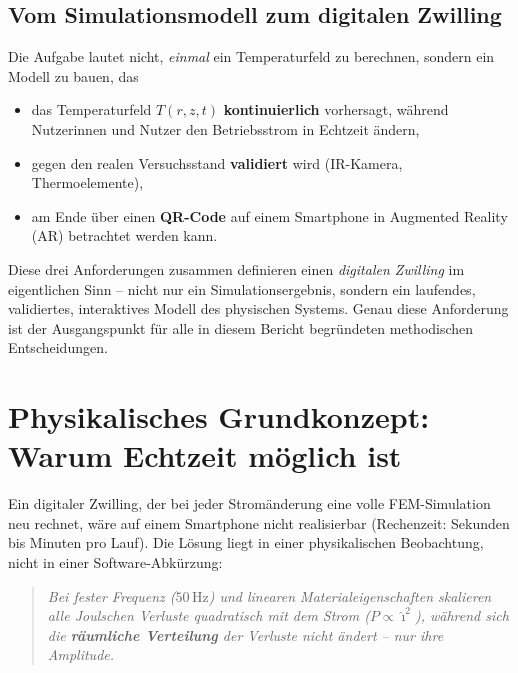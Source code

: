 \documentclass[a4paper,11pt]{article}
\begin{document}
\subsection{Vom Simulationsmodell zum digitalen Zwilling}
Die Aufgabe lautet nicht, \emph{einmal} ein Temperaturfeld zu berechnen,
sondern ein Modell zu bauen, das
\begin{itemize}[nosep]
  \item das Temperaturfeld $T(r,z,t)$ \textbf{kontinuierlich} vorhersagt, während
        Nutzerinnen und Nutzer den Betriebsstrom in Echtzeit ändern,
  \item gegen den realen Versuchsstand \textbf{validiert} wird (IR-Kamera,
        Thermoelemente),
  \item am Ende über einen \textbf{QR-Code} auf einem Smartphone in
        Augmented Reality (AR) betrachtet werden kann.
\end{itemize}
Diese drei Anforderungen zusammen definieren einen \emph{digitalen Zwilling}
im eigentlichen Sinn -- nicht nur ein Simulationsergebnis, sondern ein
laufendes, validiertes, interaktives Modell des physischen Systems. Genau
diese Anforderung ist der Ausgangspunkt für alle in diesem Bericht
begründeten methodischen Entscheidungen.

\section{Physikalisches Grundkonzept: Warum Echtzeit möglich ist}

Ein digitaler Zwilling, der bei jeder Stromänderung eine volle FEM-Simulation
neu rechnet, wäre auf einem Smartphone nicht realisierbar (Rechenzeit:
Sekunden bis Minuten pro Lauf). Die Lösung liegt in einer physikalischen
Beobachtung, nicht in einer Software-Abkürzung:

\begin{quote}
\itshape
Bei fester Frequenz ($50\,\mathrm{Hz}$) und linearen Materialeigenschaften
skalieren alle Joulschen Verluste quadratisch mit dem Strom
($P \propto \hat{\imath}^2$), während sich die \textbf{räumliche
Verteilung} der Verluste \emph{nicht} ändert -- nur ihre Amplitude.
\end{quote}
\end{document}
